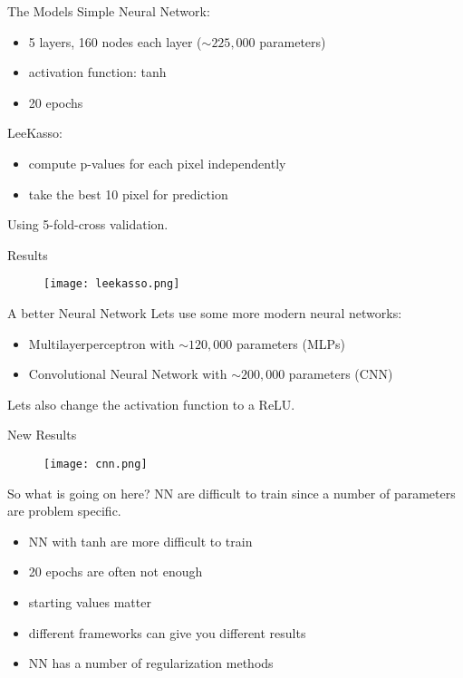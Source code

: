 \documentclass{beamer}
\begin{document}
\begin{frame}[t]{The Models}
    Simple Neural Network:
      \begin{itemize}
        \item 5 layers, 160 nodes each layer ($\sim225,000$ parameters)
        \item activation function: tanh
        \item 20 epochs
      \end{itemize}
      LeeKasso:
      \begin{itemize}
        \item compute p-values for each pixel independently
        \item take the best 10 pixel for prediction
      \end{itemize}
  Using 5-fold-cross validation.
\end{frame}

\begin{frame}[t]{Results}
  \begin{figure}[htpb]
    \centering
    \texttt{[image: leekasso.png]}
  \end{figure}
\end{frame}

\begin{frame}[t]{A better Neural Network}
  Lets use some more modern neural networks:
  \begin{itemize}
    \item Multilayerperceptron with $\sim120,000$ parameters (MLPs)
    \item Convolutional Neural Network with $\sim200,000$ parameters (CNN)
  \end{itemize}
  Lets also change the activation function to a ReLU.
\end{frame}

\begin{frame}[t]{New Results}
  \begin{figure}[htpb]
    \centering
    \texttt{[image: cnn.png]}
  \end{figure}
\end{frame}

\begin{frame}[t]{So what is going on here?}
  NN are difficult to train since a number of parameters are problem specific.
  \begin{itemize}
    \item NN with tanh are more difficult to train
    \item 20 epochs are often not enough
    \item starting values matter
    \item different frameworks can give you different results
    \item NN has a number of regularization methods
  \end{itemize}
\end{frame}
\end{document}
